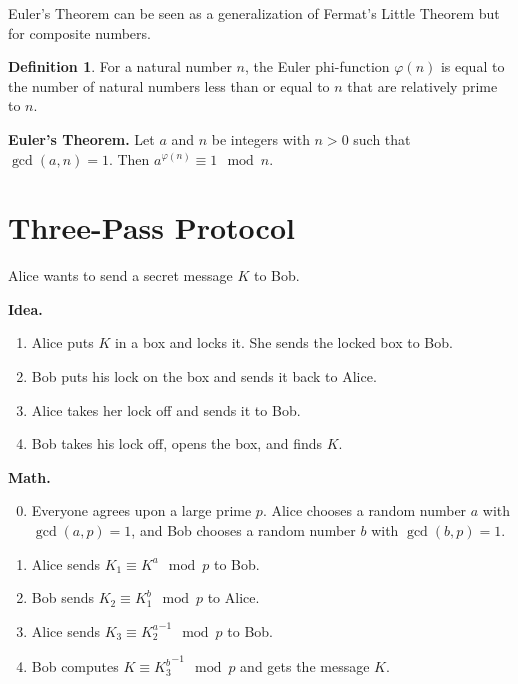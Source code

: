 \documentclass[12pt]{amsart}
\theoremstyle{plain}
\theoremstyle{definition}
\newtheorem*{defn}{Definition}
\theoremstyle{remark}
\begin{document}
Euler's Theorem can be seen as a generalization of Fermat's Little Theorem but for composite numbers.

\begin{defn} For a natural number $n$, the Euler phi-function $\varphi(n)$ is equal to the number of natural numbers less than or equal to $n$ that are relatively prime to $n$.
\end{defn}

\vspace{1in}

\noindent\textbf{Euler's Theorem.} Let $a$ and $n$ be integers with $n > 0$ such that $\gcd(a,n) = 1$. Then $a^{\varphi(n)} \equiv 1 \mod n$.

\newpage
\section{Three-Pass Protocol}
Alice wants to send a secret message $K$ to Bob.

\noindent \textbf{Idea.}
\begin{enumerate}[1.]
	\item Alice puts $K$ in a box and locks it.  She sends the locked box to Bob.
	\item Bob puts his lock on the box and sends it back to Alice.
	\item Alice takes her lock off and sends it to Bob.
	\item Bob takes his lock off, opens the box, and finds $K$.
\end{enumerate}

\noindent \textbf{Math.}
\begin{enumerate}[1.]
	\setcounter{enumi}{-1}
	\item Everyone agrees upon a large prime $p$.  Alice chooses a random number $a$ with $\gcd(a,p) = 1$, and Bob chooses a random number $b$ with $\gcd(b,p) = 1$.
	\item Alice sends $K_1 \equiv K^a \mod p$ to Bob.
	\item Bob sends $K_2 \equiv K_1^b \mod p$ to Alice.
	\item Alice sends $K_3 \equiv {K_2^a}^{-1} \mod p$ to Bob.
	\item Bob computes $K \equiv {K_3^b}^{-1} \mod p$ and gets the message $K$.
\end{enumerate}
\end{document}
